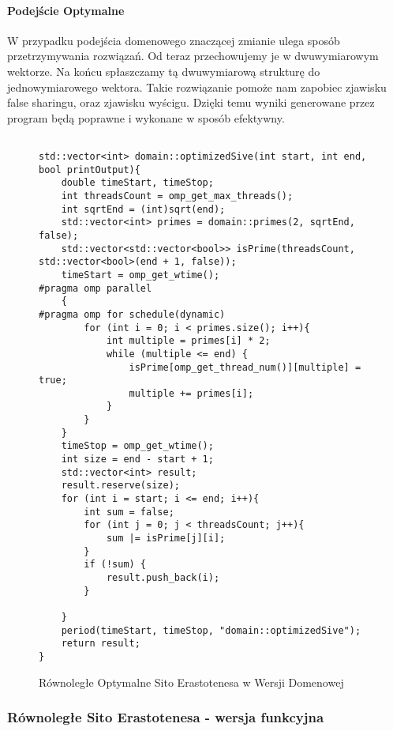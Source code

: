 \documentclass{article}
\begin{document}
                \paragraph{Podejście Optymalne}
                    W przypadku podejścia domenowego znaczącej zmianie ulega sposób przetrzymywania rozwiązań. Od teraz przechowujemy je w dwuwymiarowym wektorze. Na końcu spłaszczamy tą dwuwymiarową strukturę do jednowymiarowego wektora. Takie rozwiązanie pomoże nam zapobiec zjawisku false sharingu, oraz zjawisku wyścigu. Dzięki temu wyniki generowane przez program będą poprawne i wykonane w sposób efektywny.
                    \begin{figure}[H]
                        \begin{verbatim}

std::vector<int> domain::optimizedSive(int start, int end, bool printOutput){
    double timeStart, timeStop;
    int threadsCount = omp_get_max_threads();
    int sqrtEnd = (int)sqrt(end);
    std::vector<int> primes = domain::primes(2, sqrtEnd, false);
    std::vector<std::vector<bool>> isPrime(threadsCount, std::vector<bool>(end + 1, false));
    timeStart = omp_get_wtime();
#pragma omp parallel
    {
#pragma omp for schedule(dynamic)
        for (int i = 0; i < primes.size(); i++){
            int multiple = primes[i] * 2;
            while (multiple <= end) {
                isPrime[omp_get_thread_num()][multiple] = true;
                multiple += primes[i];
            }
        }
    }
    timeStop = omp_get_wtime();
    int size = end - start + 1;
    std::vector<int> result;
    result.reserve(size);
    for (int i = start; i <= end; i++){
        int sum = false;
        for (int j = 0; j < threadsCount; j++){
            sum |= isPrime[j][i];
        }
        if (!sum) {
            result.push_back(i);
        }

    }
    period(timeStart, timeStop, "domain::optimizedSive");
    return result;
}
                        \end{verbatim}
                        \caption{Równoległe Optymalne Sito Erastotenesa w Wersji Domenowej}
                    \end{figure}
                
                \subsubsection{Równoległe Sito Erastotenesa - wersja funkcyjna}
                    
\end{document}
